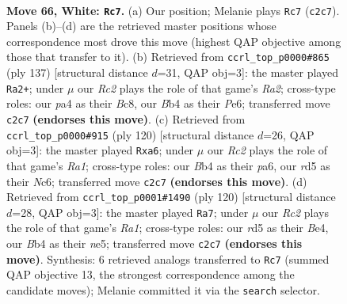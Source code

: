 \documentclass[11pt]{article}
\begin{document}
\clearpage

\begin{figure}[p]\centering
\begin{subfigure}{0.46\textwidth}\centering
\resizebox{\linewidth}{!}{%
\newchessgame
\chessboard[
  setfen={6k1/5p2/5n2/3r4/pB3P1p/P3K2P/2R5/8 w - - 7 66},
  showmover=false,
  pgfstyle=straightmove, color=movearrow, markmove={c2-c7}
]}
\caption{}
\end{subfigure}\hfill
\begin{subfigure}{0.46\textwidth}\centering
\resizebox{\linewidth}{!}{%
\newchessgame
\chessboard[
  setfen={2b5/r3k3/2p1p3/6p1/3RN1P1/5P2/5K2/8 b - - 1 69},
  showmover=false,
  pgfstyle=straightmove, color=movearrow, markmove={a7-a2}
]}
\caption{}
\end{subfigure}
\\[4pt]
\begin{subfigure}{0.46\textwidth}\centering
\resizebox{\linewidth}{!}{%
\newchessgame
\chessboard[
  setfen={6k1/7r/p1Np1n2/8/8/1P3PP1/2PK4/R7 w - - 2 61},
  showmover=false,
  pgfstyle=straightmove, color=movearrow, markmove={a1-a6}
]}
\caption{}
\end{subfigure}\hfill
\begin{subfigure}{0.46\textwidth}\centering
\resizebox{\linewidth}{!}{%
\newchessgame
\chessboard[
  setfen={8/5p2/3r1k2/1p2n3/1P2B1p1/4P3/4KP2/R7 w - - 2 61},
  showmover=false,
  pgfstyle=straightmove, color=movearrow, markmove={a1-a7}
]}
\caption{}
\end{subfigure}
\caption{\textbf{Move 66, White: \texttt{Rc7}.} (a) Our position; Melanie plays \texttt{Rc7} (\texttt{c2c7}). Panels (b)--(d) are the retrieved master positions whose correspondence most drove this move (highest QAP objective among those that transfer to it). (b) Retrieved from \texttt{ccrl\_top\_p0000\#865} (ply 137) [structural distance $d$=31, QAP obj=3]: the master played \texttt{Ra2+}; under $\mu$ our \emph{Rc2} plays the role of that game's \emph{Ra2}; cross-type roles: our \emph{p}a4 as their \emph{B}c8, our \emph{B}b4 as their \emph{P}e6; transferred move \texttt{c2c7} \textbf{(endorses this move)}. (c) Retrieved from \texttt{ccrl\_top\_p0000\#915} (ply 120) [structural distance $d$=26, QAP obj=3]: the master played \texttt{Rxa6}; under $\mu$ our \emph{Rc2} plays the role of that game's \emph{Ra1}; cross-type roles: our \emph{B}b4 as their \emph{p}a6, our \emph{r}d5 as their \emph{N}c6; transferred move \texttt{c2c7} \textbf{(endorses this move)}. (d) Retrieved from \texttt{ccrl\_top\_p0001\#1490} (ply 120) [structural distance $d$=28, QAP obj=3]: the master played \texttt{Ra7}; under $\mu$ our \emph{Rc2} plays the role of that game's \emph{Ra1}; cross-type roles: our \emph{r}d5 as their \emph{B}e4, our \emph{B}b4 as their \emph{n}e5; transferred move \texttt{c2c7} \textbf{(endorses this move)}. Synthesis: 6 retrieved analogs transferred to \texttt{Rc7} (summed QAP objective 13, the strongest correspondence among the candidate moves); Melanie committed it via the \texttt{search} selector.}
\label{fig:thought-m130}
\end{figure}
\end{document}
